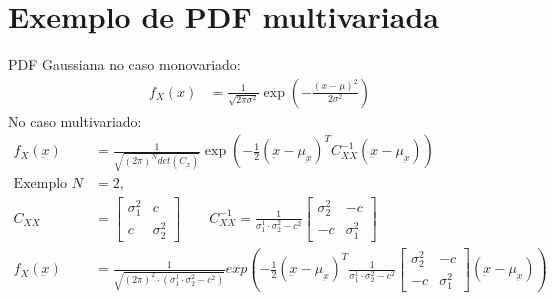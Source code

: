 \documentclass{article}
\renewcommand\u[1]{\underbar{#1}}
\begin{document}
\section{Exemplo de PDF multivariada}
PDF Gaussiana no caso monovariado:
\begin{align*}
f_X(x) &= \frac{1}{\sqrt{2\pi\sigma^2}} \exp\left({-\frac{(x-\mu)^2}{2\sigma^2}}\right)
\end{align*}
No caso multivariado:
\begin{align*}
    f_X(\u{x}) &= \frac{1}{\sqrt{(2\pi)^N det(C_{\u{x}})}} \exp\left({-\frac{1}{2} (\u{x}-\mu_{\u{x}})^T C_{XX}^{-1}(\u{x}-\mu_{\u{x}})}\right) \\
    \text{Exemplo } N &= 2, \\
    C_{XX} &=
    \begin{bmatrix}
        \sigma^2_1 & c\\
        c & \sigma^2_2
    \end{bmatrix} \qquad
    C_{XX}^{-1} = \frac{1}{\sigma_1^1 \cdot \sigma_2^2 - c^2}
    \begin{bmatrix}
        \sigma^2_2 & -c\\
        -c & \sigma^2_1
    \end{bmatrix} \\
    f_X(\u{x}) &= \frac{1}{\sqrt{(2 \pi)^2 \cdot (\sigma_1^1 \cdot \sigma_2^2 - c^2)}}
    exp\left({-\frac{1}{2} (\u{x}-\mu_{\u{x}})^T \frac{1}{\sigma_1^1 \cdot \sigma_2^2 - c^2}
        \begin{bmatrix}
            \sigma^2_2 & -c\\
            -c & \sigma^2_1
        \end{bmatrix}
    (\u{x}-\mu_{\u{x}})}\right)
\end{align*}
\end{document}
